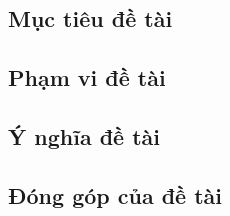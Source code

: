     \subsection{Mục tiêu đề tài}
    
    \subsection{Phạm vi đề tài}
    
    \subsection{Ý nghĩa đề tài}
    
    \subsection{Đóng góp của đề tài}

